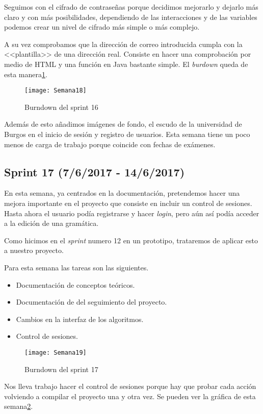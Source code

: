 Seguimos con el cifrado de contraseñas porque decidimos mejorarlo y dejarlo más claro y con más posibilidades, dependiendo de las interacciones y de las variables podemos crear un nivel de cifrado más simple o más complejo. 

A su vez comprobamos que la dirección de correo introducida cumpla con la <<plantilla>> de una dirección real. Consiste en hacer una comprobación por medio de HTML y una función en Java bastante simple. El \emph{burdown} queda de esta manera\ref{fig:A.15}.

\begin{figure}[h]
\centering
\texttt{[image: Semana18]}
\caption{Burndown del sprint 16}
\label{fig:A.15}
\end{figure}

Además de esto añadimos imágenes de fondo, el escudo de la universidad de Burgos en el inicio de sesión y registro de usuarios. Esta semana tiene un poco menos de carga de trabajo porque coincide con fechas de exámenes.

\subsection{Sprint 17 (7/6/2017 - 14/6/2017)}

En esta semana, ya centrados en la documentación, pretendemos hacer una mejora importante en el proyecto que consiste en incluir un control de sesiones. Hasta ahora el usuario podía registrarse y hacer \emph{login}, pero aún así podía acceder a la edición de una gramática.

Como hicimos en el \emph{sprint} numero 12 en un prototipo, trataremos de aplicar esto a nuestro proyecto.

Para esta semana las tareas son las siguientes.
\begin{itemize}
\item Documentación de conceptos teóricos.
\item Documentación de del seguimiento del proyecto.
\item Cambios en la interfaz de los algoritmos.
\item Control de sesiones.
\end{itemize}

\begin{figure}[h]
\centering
\texttt{[image: Semana19]}
\caption{Burndown del sprint 17}
\label{fig:A.16}
\end{figure}

Nos lleva trabajo hacer el control de sesiones porque hay que probar cada acción volviendo a compilar el proyecto una y otra vez. Se pueden ver la gráfica de esta semana\ref{fig:A.16}.

